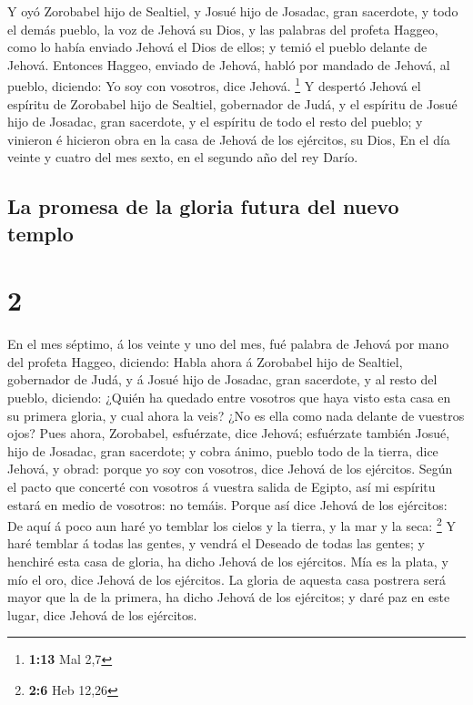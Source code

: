  Y oyó Zorobabel hijo de Sealtiel, y Josué hijo de Josadac,
gran sacerdote, y todo el demás pueblo, la voz de Jehová su Dios, y las
palabras del profeta Haggeo, como lo había enviado Jehová el Dios de
ellos; y temió el pueblo delante de Jehová.  Entonces
Haggeo, enviado de Jehová, habló por mandado de Jehová, al pueblo,
diciendo: Yo soy con vosotros, dice Jehová. \footnote{\textbf{1:13} Mal
  2,7}  Y despertó Jehová el espíritu de Zorobabel hijo de
Sealtiel, gobernador de Judá, y el espíritu de Josué hijo de Josadac,
gran sacerdote, y el espíritu de todo el resto del pueblo; y vinieron é
hicieron obra en la casa de Jehová de los ejércitos, su Dios,
 En el día veinte y cuatro del mes sexto, en el segundo año
del rey Darío.

\hypertarget{la-promesa-de-la-gloria-futura-del-nuevo-templo}{%
\subsection{La promesa de la gloria futura del nuevo
templo}\label{la-promesa-de-la-gloria-futura-del-nuevo-templo}}

\hypertarget{section-1}{%
\section{2}\label{section-1}}

 En el mes séptimo, á los veinte y uno del mes, fué palabra
de Jehová por mano del profeta Haggeo, diciendo:  Habla
ahora á Zorobabel hijo de Sealtiel, gobernador de Judá, y á Josué hijo
de Josadac, gran sacerdote, y al resto del pueblo, diciendo:
 ¿Quién ha quedado entre vosotros que haya visto esta casa
en su primera gloria, y cual ahora la veis? ¿No es ella como nada
delante de vuestros ojos?  Pues ahora, Zorobabel,
esfuérzate, dice Jehová; esfuérzate también Josué, hijo de Josadac, gran
sacerdote; y cobra ánimo, pueblo todo de la tierra, dice Jehová, y
obrad: porque yo soy con vosotros, dice Jehová de los ejércitos.
 Según el pacto que concerté con vosotros á vuestra salida
de Egipto, así mi espíritu estará en medio de vosotros: no temáis.
 Porque así dice Jehová de los ejércitos: De aquí á poco aun
haré yo temblar los cielos y la tierra, y la mar y la seca: \footnote{\textbf{2:6}
  Heb 12,26}  Y haré temblar á todas las gentes, y vendrá el
Deseado de todas las gentes; y henchiré esta casa de gloria, ha dicho
Jehová de los ejércitos.  Mía es la plata, y mío el oro,
dice Jehová de los ejércitos.  La gloria de aquesta casa
postrera será mayor que la de la primera, ha dicho Jehová de los
ejércitos; y daré paz en este lugar, dice Jehová de los ejércitos.


